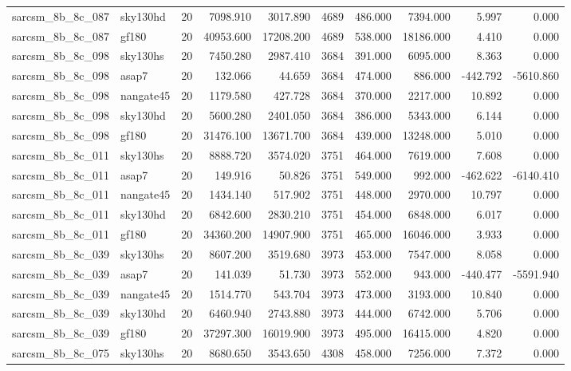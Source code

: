 \documentclass{article}
\begin{document}
\begin{longtable}{llrrrrrrrr}
sarcsm\_8b\_8c\_087 & sky130hd & 20 & 7098.910 & 3017.890 & 4689 & 486.000 & 7394.000 & 5.997 & 0.000 \\
sarcsm\_8b\_8c\_087 & gf180 & 20 & 40953.600 & 17208.200 & 4689 & 538.000 & 18186.000 & 4.410 & 0.000 \\
sarcsm\_8b\_8c\_098 & sky130hs & 20 & 7450.280 & 2987.410 & 3684 & 391.000 & 6095.000 & 8.363 & 0.000 \\
sarcsm\_8b\_8c\_098 & asap7 & 20 & 132.066 & 44.659 & 3684 & 474.000 & 886.000 & -442.792 & -5610.860 \\
sarcsm\_8b\_8c\_098 & nangate45 & 20 & 1179.580 & 427.728 & 3684 & 370.000 & 2217.000 & 10.892 & 0.000 \\
sarcsm\_8b\_8c\_098 & sky130hd & 20 & 5600.280 & 2401.050 & 3684 & 386.000 & 5343.000 & 6.144 & 0.000 \\
sarcsm\_8b\_8c\_098 & gf180 & 20 & 31476.100 & 13671.700 & 3684 & 439.000 & 13248.000 & 5.010 & 0.000 \\
sarcsm\_8b\_8c\_011 & sky130hs & 20 & 8888.720 & 3574.020 & 3751 & 464.000 & 7619.000 & 7.608 & 0.000 \\
sarcsm\_8b\_8c\_011 & asap7 & 20 & 149.916 & 50.826 & 3751 & 549.000 & 992.000 & -462.622 & -6140.410 \\
sarcsm\_8b\_8c\_011 & nangate45 & 20 & 1434.140 & 517.902 & 3751 & 448.000 & 2970.000 & 10.797 & 0.000 \\
sarcsm\_8b\_8c\_011 & sky130hd & 20 & 6842.600 & 2830.210 & 3751 & 454.000 & 6848.000 & 6.017 & 0.000 \\
sarcsm\_8b\_8c\_011 & gf180 & 20 & 34360.200 & 14907.900 & 3751 & 465.000 & 16046.000 & 3.933 & 0.000 \\
sarcsm\_8b\_8c\_039 & sky130hs & 20 & 8607.200 & 3519.680 & 3973 & 453.000 & 7547.000 & 8.058 & 0.000 \\
sarcsm\_8b\_8c\_039 & asap7 & 20 & 141.039 & 51.730 & 3973 & 552.000 & 943.000 & -440.477 & -5591.940 \\
sarcsm\_8b\_8c\_039 & nangate45 & 20 & 1514.770 & 543.704 & 3973 & 473.000 & 3193.000 & 10.840 & 0.000 \\
sarcsm\_8b\_8c\_039 & sky130hd & 20 & 6460.940 & 2743.880 & 3973 & 444.000 & 6742.000 & 5.706 & 0.000 \\
sarcsm\_8b\_8c\_039 & gf180 & 20 & 37297.300 & 16019.900 & 3973 & 495.000 & 16415.000 & 4.820 & 0.000 \\
sarcsm\_8b\_8c\_075 & sky130hs & 20 & 8680.650 & 3543.650 & 4308 & 458.000 & 7256.000 & 7.372 & 0.000 \\

\end{longtable}
\end{document}
